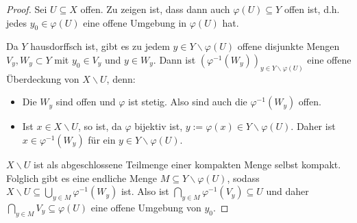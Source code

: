 \begin{proof}Sei $U \subseteq X$ offen. Zu zeigen ist, dass dann auch $\varphi(U) \subseteq Y$ offen ist, d.h. jedes $y_0 \in \varphi(U)$ eine offene Umgebung in $\varphi(U)$ hat.

Da $Y$ hausdorffsch ist, gibt es zu jedem $y \in Y \backslash \varphi(U)$ offene disjunkte Mengen $V_y, W_y \subset Y$ mit $y_0 \in V_y$ und $y \in W_y$. Dann ist $(\varphi^{-1}(W_y))_{y \in Y\backslash \varphi(U)}$ eine offene Überdeckung von $X \backslash U$, denn:
\begin{itemize}
	\item Die $W_y$ sind offen und $\varphi$ ist stetig. Also sind auch die $\varphi^{-1}(W_y)$ offen.
	\item Ist $x \in X \backslash U$, so ist, da $\varphi$ bijektiv ist, $y := \varphi(x) \in Y \backslash \varphi(U)$. Daher ist $x \in \varphi^{-1}(W_y)$ für ein $y \in Y \backslash \varphi(U)$. 
\end{itemize}

$X \backslash U$ ist als abgeschlossene Teilmenge einer kompakten Menge selbst kompakt. Folglich gibt es eine endliche Menge $M \subseteq Y \backslash \varphi(U)$, sodass $X \backslash U \subseteq \bigcup_{y \in M}\varphi^{-1}(W_y)$ ist. Also ist $\bigcap_{y \in M}\varphi^{-1}(V_y) \subseteq U$ und daher $\bigcap_{y \in M}V_y \subseteq \varphi(U)$ eine offene Umgebung von $y_0$.
\end{proof}